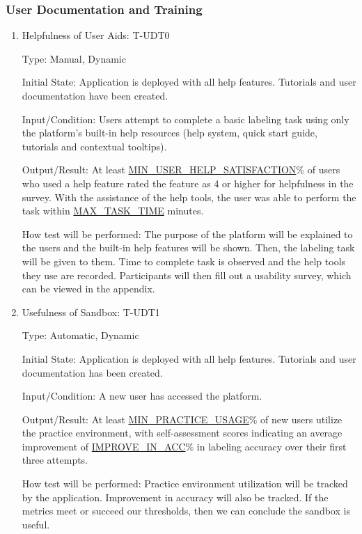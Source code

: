 \documentclass[12pt, titlepage]{article}
\begin{document}
\subsubsection{User Documentation and Training}

\begin{enumerate}

\item{Helpfulness of User Aids: T-UDT0\\}

Type: Manual, Dynamic
					
Initial State: Application is deployed with all help features. Tutorials and user documentation have been created.
					
Input/Condition: Users attempt to complete a basic labeling task using only the platform’s built-in help resources (help system, quick start guide, tutorials and contextual tooltips).
					
Output/Result: At least \hyperref[MIN_USER_HELP_SATISFACTION]{MIN\_USER\_HELP\_SATISFACTION}\% of users who used a help feature rated the feature as 4 or higher for helpfulness in the survey. With the assistance of the help tools, the user was able to perform the task within \hyperref[MAX_TASK_TIME]{MAX\_TASK\_TIME} minutes.
					
How test will be performed: The purpose of the platform will be explained to the users and the built-in help features will be shown. Then, the labeling task will be given to them. Time to complete task is observed and the help tools they use are recorded. Participants will then fill out a usability survey, which can be viewed in the appendix.

\item{Usefulness of Sandbox: T-UDT1\\}

Type: Automatic, Dynamic
					
Initial State: Application is deployed with all help features. Tutorials and user documentation has been created.
					
Input/Condition: A new user has accessed the platform.
					
Output/Result: At least \hyperref[MIN_PRACTICE_USAGE]{MIN\_PRACTICE\_USAGE}\% of new users utilize the practice environment, with self-assessment scores indicating an average improvement of \hyperref[IMPROVE_IN_ACC]{IMPROVE\_IN\_ACC}\% in labeling accuracy over their first three attempts.
					
How test will be performed: Practice environment utilization will be tracked by the application. Improvement in accuracy will also be tracked. If the metrics meet or succeed our thresholds, then we can conclude the sandbox is useful.
\end{enumerate}
\end{document}

